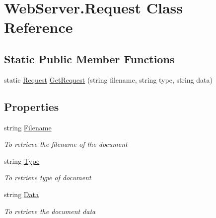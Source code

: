 \hypertarget{class_web_server_1_1_request}{}\section{Web\+Server.\+Request Class Reference}
\label{class_web_server_1_1_request}


 


\subsection*{Static Public Member Functions}
\begin{DoxyCompactItemize}
\item 
static \hyperlink{class_web_server_1_1_request}{Request} \hyperlink{class_web_server_1_1_request_aa79751fd888bac7c160ab4d06ba6d20a}{Get\+Request} (string filename, string type, string data)
\end{DoxyCompactItemize}
\subsection*{Properties}
\begin{DoxyCompactItemize}
\item 
string \hyperlink{class_web_server_1_1_request_a1797bd8f10a7b7131cf7b90df7a250af}{Filename}
\begin{DoxyCompactList}\small\item\em To retrieve the filename of the document \end{DoxyCompactList}\item 
string \hyperlink{class_web_server_1_1_request_a97f8cec3d26773cdc2d227817be59bfe}{Type}
\begin{DoxyCompactList}\small\item\em To retrieve type of document \end{DoxyCompactList}\item 
string \hyperlink{class_web_server_1_1_request_a42134399b1ac8892af03d7f0a52dcd2d}{Data}
\begin{DoxyCompactList}\small\item\em To retrieve the document data \end{DoxyCompactList}\end{DoxyCompactItemize}


